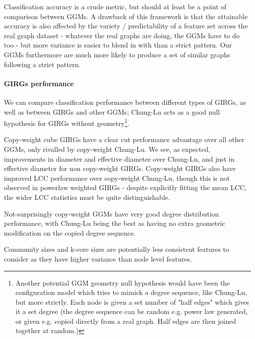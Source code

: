 Classification accuracy is a crude metric, but should at least be a point of comparison between GGMs. 
A drawback of this framework is that the attainable accuracy is also affected by the variety / predictability of a feature set across the real graph dataset - whatever the real graphs are doing, the GGMs have to do too - but more variance is easier to blend in with than a strict pattern. Our GGMs furthermore are much more likely to produce a set of similar graphs following a strict pattern.

\paragraph{GIRGs performance}
We can compare classification performance between different types of GIRGs, as well as between GIRGs and other GGMs; Chung-Lu acts as a good null hypothesis for GIRGs without geometry\footnote{Another potential GGM geometry null hypothesis would have been the configuration model which tries to mimick a degree sequence, like Chung-Lu, but more strictly. Each node is given a set number of "half edges" which gives it a set degree (the degree sequence can be random e.g. power law generated, or given e.g. copied directly from a real graph. Half edges are then joined together at random.)}.

Copy-weight cube GIRGs have a clear cut performance advantage over all other GGMs, only rivalled by copy-weight Chung-Lu. We see, as expected, improvements in diameter and effective diameter over Chung-Lu, and just in effective diameter for non copy-weight GIRGs. Copy-weight GIRGs also have improved LCC performance over copy-weight Chung-Lu, though this is not observed in powerlaw weighted GIRGs - despite explicitly fitting the mean LCC, the wider LCC statistics must be quite distinguishable. 

Not-surprisingly copy-weight GGMs have very good degree distribution performance, with Chung-Lu being the best as having no extra geometric modification on the copied degree sequence.

Community sizes and k-core sizes are potentially less consistent features to consider as they have higher variance than node level features.



